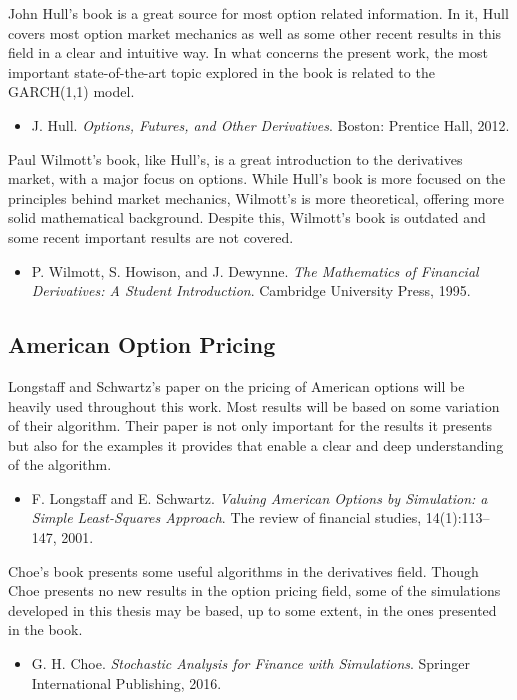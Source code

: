 \documentclass[a4paper,twocolumn,aps,prd,longbibliography,superscriptaddress]{revtex4-1}
\begin{document}
John Hull's book is a great source for most option related information. In it, Hull covers most option market mechanics as well as some other recent results in this field in a clear and intuitive way.
In what concerns the present work, the most important state-of-the-art topic explored in the book is related to the GARCH(1,1) model.
\begin{itemize}
\item J. Hull. \textit{Options, Futures, and Other Derivatives}. Boston: Prentice Hall, 2012.
\end{itemize}

Paul Wilmott's book, like Hull's, is a great introduction to the derivatives market, with a major focus on options. While Hull's book is more focused on the principles behind market mechanics, Wilmott's is more theoretical, offering more solid mathematical background.
Despite this, Wilmott's book is outdated and some recent important results are not covered.
\begin{itemize}
\item P. Wilmott, S. Howison, and J. Dewynne. \textit{The Mathematics of Financial Derivatives: A Student Introduction}. Cambridge University Press, 1995.
\end{itemize}

\subsection{American Option Pricing}
Longstaff and Schwartz's paper on the pricing of American options will be heavily used throughout this work. Most results will be based on some variation of their algorithm. Their paper is not only important for the results it presents but also for the examples it provides that enable a clear and deep understanding of the algorithm.
\begin{itemize}
\item  F. Longstaff and E. Schwartz. \textit{Valuing American Options by Simulation: a Simple Least-Squares Approach}. The review of financial studies, 14(1):113–147, 2001.
\end{itemize}

Choe's book presents some useful algorithms in the derivatives field. Though Choe presents no new results in the option pricing field, some of the simulations developed in this thesis may be based, up to some extent, in the ones presented in the book.
\begin{itemize}
\item G. H. Choe. \textit{Stochastic Analysis for Finance with Simulations}. Springer International Publishing, 2016.
\end{itemize}
\end{document}
